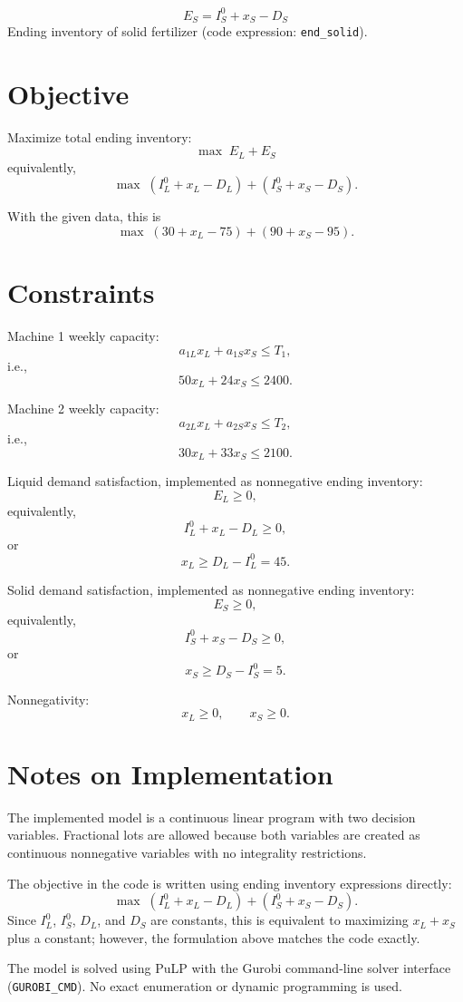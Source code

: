 \[
E_S = I_S^0 + x_S - D_S
\]
Ending inventory of solid fertilizer (code expression: \texttt{end\_solid}).

\section*{Objective}

Maximize total ending inventory:
\[
\max \; E_L + E_S
\]
equivalently,
\[
\max \; \left(I_L^0 + x_L - D_L\right) + \left(I_S^0 + x_S - D_S\right).
\]

With the given data, this is
\[
\max \; (30 + x_L - 75) + (90 + x_S - 95).
\]

\section*{Constraints}

Machine 1 weekly capacity:
\[
a_{1L}x_L + a_{1S}x_S \le T_1,
\]
i.e.,
\[
50x_L + 24x_S \le 2400.
\]

Machine 2 weekly capacity:
\[
a_{2L}x_L + a_{2S}x_S \le T_2,
\]
i.e.,
\[
30x_L + 33x_S \le 2100.
\]

Liquid demand satisfaction, implemented as nonnegative ending inventory:
\[
E_L \ge 0,
\]
equivalently,
\[
I_L^0 + x_L - D_L \ge 0,
\]
or
\[
x_L \ge D_L - I_L^0 = 45.
\]

Solid demand satisfaction, implemented as nonnegative ending inventory:
\[
E_S \ge 0,
\]
equivalently,
\[
I_S^0 + x_S - D_S \ge 0,
\]
or
\[
x_S \ge D_S - I_S^0 = 5.
\]

Nonnegativity:
\[
x_L \ge 0,\qquad x_S \ge 0.
\]

\section*{Notes on Implementation}

The implemented model is a continuous linear program with two decision variables. Fractional lots are allowed because both variables are created as continuous nonnegative variables with no integrality restrictions.

The objective in the code is written using ending inventory expressions directly:
\[
\max \; (I_L^0 + x_L - D_L) + (I_S^0 + x_S - D_S).
\]
Since \(I_L^0\), \(I_S^0\), \(D_L\), and \(D_S\) are constants, this is equivalent to maximizing \(x_L + x_S\) plus a constant; however, the formulation above matches the code exactly.

The model is solved using PuLP with the Gurobi command-line solver interface (\texttt{GUROBI\_CMD}). No exact enumeration or dynamic programming is used.
